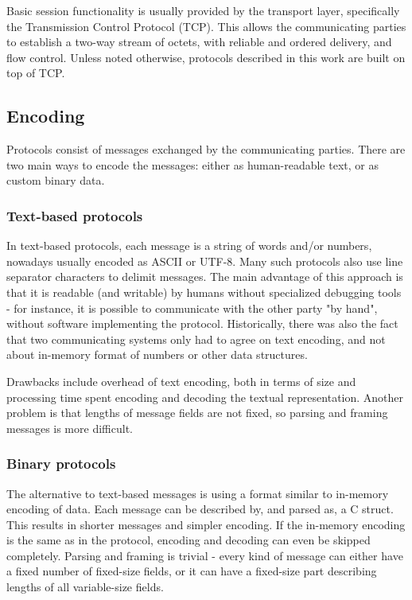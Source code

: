 Basic session functionality is usually provided by the transport layer, specifically the Transmission Control
Protocol (TCP). This allows the communicating parties to establish a two-way stream of octets, with reliable
and ordered delivery, and flow control. Unless noted otherwise, protocols described in this work are built on
top of TCP.


\subsection{Encoding}

Protocols consist of messages exchanged by the communicating parties. There are two main ways to encode the
messages: either as human-readable text, or as custom binary data.

\subsubsection{Text-based protocols}

In text-based protocols, each message is a string of words and/or numbers, nowadays usually encoded as ASCII
or UTF-8. Many such protocols also use line separator characters to delimit messages. The main advantage of
this approach is that it is readable (and writable) by humans without specialized debugging tools - for
instance, it is possible to communicate with the other party "by hand", without software implementing the
protocol. Historically, there was also the fact that two communicating systems only had to agree on text
encoding, and not about in-memory format of numbers or other data structures.

Drawbacks include overhead of text encoding, both in terms of size and processing time spent encoding and
decoding the textual representation. Another problem is that lengths of message fields are not fixed, so
parsing and framing messages is more difficult.

\subsubsection{Binary protocols}

The alternative to text-based messages is using a format similar to in-memory encoding of data. Each message
can be described by, and parsed as, a C struct\footnotemark[2]. This results in shorter messages and simpler
encoding. If the in-memory encoding is the same as in the protocol, encoding and decoding can even be skipped
completely. Parsing and framing is trivial - every kind of message can either have a fixed number of
fixed-size fields, or it can have a fixed-size part describing lengths of all variable-size fields.

